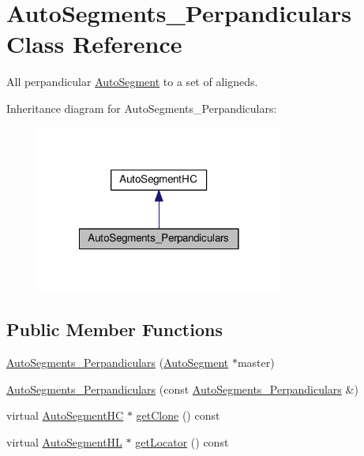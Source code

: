 \hypertarget{classKatabatic_1_1AutoSegments__Perpandiculars}{}\section{Auto\+Segments\+\_\+\+Perpandiculars Class Reference}
\label{classKatabatic_1_1AutoSegments__Perpandiculars}


All perpandicular \mbox{\hyperlink{classKatabatic_1_1AutoSegment}{Auto\+Segment}} to a set of aligneds.  




Inheritance diagram for Auto\+Segments\+\_\+\+Perpandiculars\+:\nopagebreak
\begin{figure}[H]
\begin{center}
\leavevmode
\includegraphics[width=230pt]{classKatabatic_1_1AutoSegments__Perpandiculars__inherit__graph}
\end{center}
\end{figure}
\subsection*{Public Member Functions}
\begin{DoxyCompactItemize}
\item 
\mbox{\hyperlink{classKatabatic_1_1AutoSegments__Perpandiculars_ab5cb1a0042b95cb6bd56997cdfbf0e6f}{Auto\+Segments\+\_\+\+Perpandiculars}} (\mbox{\hyperlink{classKatabatic_1_1AutoSegment}{Auto\+Segment}} $\ast$master)
\item 
\mbox{\hyperlink{classKatabatic_1_1AutoSegments__Perpandiculars_ac2d21dfaa510352fb5c1bd9aa9bd6f94}{Auto\+Segments\+\_\+\+Perpandiculars}} (const \mbox{\hyperlink{classKatabatic_1_1AutoSegments__Perpandiculars}{Auto\+Segments\+\_\+\+Perpandiculars}} \&)
\item 
virtual \mbox{\hyperlink{namespaceKatabatic_acb3628dc7705fefe38a665cfe43efa6e}{Auto\+Segment\+HC}} $\ast$ \mbox{\hyperlink{classKatabatic_1_1AutoSegments__Perpandiculars_a5b26b0698bdcb40cbf51b250dfb21858}{get\+Clone}} () const
\item 
virtual \mbox{\hyperlink{namespaceKatabatic_a40ef13471fd0e797b75d3c436813fe65}{Auto\+Segment\+HL}} $\ast$ \mbox{\hyperlink{classKatabatic_1_1AutoSegments__Perpandiculars_a07665c070fcc269aec02ce842f384483}{get\+Locator}} () const
\end{DoxyCompactItemize}


